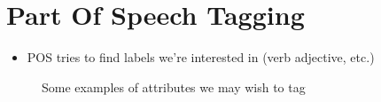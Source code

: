 \documentclass[11pt]{article}
\begin{document}


\tableofcontents

\clearpage


\section{Part Of Speech Tagging}

\begin{minipage}[l]{.5\linewidth}
    \begin{figure}[H]
        \centering
    \end{figure}    
\end{minipage}\hfill
\begin{minipage}[r]{.48\linewidth}
    \begin{itemize}
        \item POS tries to find labels we're interested in (verb adjective, etc.)
    \end{itemize}
\end{minipage}

\begin{figure}[H]
    \centering
    \caption{Some examples of attributes we may wish to tag}
\end{figure}
\end{document}
